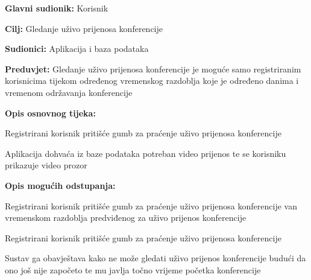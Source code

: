 				
				\noindent {}
				\begin{packed_item}
					
					\item \textbf{Glavni sudionik: }Korisnik
					\item  \textbf{Cilj:} Gledanje uživo prijenosa konferencije
					\item  \textbf{Sudionici:} Aplikacija i baza podataka
					\item  \textbf{Preduvjet:} Gledanje uživo prijenosa konferencije je moguće samo registriranim korisnicima tijekom određenog vremenskog razdoblja koje je određeno danima i vremenom održavanja konferencije
					\item  \textbf{Opis osnovnog tijeka:}
					
					\item[] \begin{packed_enum}
						
						\item Registrirani korisnik pritišće gumb za praćenje uživo prijenosa konferencije 
						\item Aplikacija dohvaća iz baze podataka potreban video prijenos te se korisniku prikazuje video prozor
					\end{packed_enum}
					
					\item  \textbf{Opis mogućih odstupanja:}
					
					\item[] \begin{packed_item}
						
						\item[1.a] Registrirani korisnik pritišće gumb za praćenje uživo prijenosa konferencije van vremenskom razdoblja predviđenog za uživo prijenos konferencije
						\item[] \begin{packed_enum}
							
							\item Registrirani korisnik pritišće gumb za praćenje uživo prijenosa konferencije 
							\item Sustav ga obavještava kako ne može gledati uživo prijenos konferencije budući da ono još nije započeto te mu javlja točno vrijeme početka konferencije
							
						\end{packed_enum}
				
						
					\end{packed_item}
				\end{packed_item}
				
